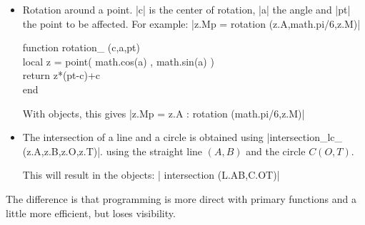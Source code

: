 \begin{itemize}
   \item Rotation around a point. |c| is the center of rotation, |a| the angle and |pt| the point to be affected.
  For example: |z.Mp = rotation (z.A,math.pi/6,z.M)|
   
\begin{mybox}
   function rotation\_ (c,a,pt)\\
     local z = point( math.cos(a) , math.sin(a) )\\
     return z*(pt-c)+c\\
   end \end{mybox}
   
   With objects, this gives |z.Mp = z.A : rotation (math.pi/6,z.M)|
   

\item  The intersection of a line and a circle is obtained using |intersection_lc_ (z.A,z.B,z.O,z.T)|.
 using the straight line $(A,B)$ and the circle $C(O,T)$.
 
 This will result in the objects: | intersection (L.AB,C.OT)|
\end{itemize}

The difference is that programming is more direct with primary functions and a little more efficient, but loses visibility.

\endinput